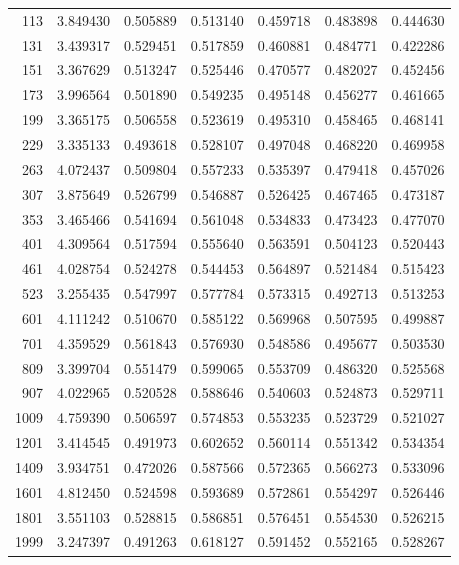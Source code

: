 \documentclass[11pt,reqno]{amsart}
\numberwithin{equation}{section}
\theoremstyle{plain}
\theoremstyle{definition}
\theoremstyle{remark}
\begin{document}
\begin{center}
\begin{longtable}{rrrrrrr}
113 & 3.849430 & 0.505889 & 0.513140 & 0.459718 & 0.483898 & 0.444630\\
131 & 3.439317 & 0.529451 & 0.517859 & 0.460881 & 0.484771 & 0.422286\\
151 & 3.367629 & 0.513247 & 0.525446 & 0.470577 & 0.482027 & 0.452456\\
173 & 3.996564 & 0.501890 & 0.549235 & 0.495148 & 0.456277 & 0.461665\\
199 & 3.365175 & 0.506558 & 0.523619 & 0.495310 & 0.458465 & 0.468141\\
229 & 3.335133 & 0.493618 & 0.528107 & 0.497048 & 0.468220 & 0.469958\\
263 & 4.072437 & 0.509804 & 0.557233 & 0.535397 & 0.479418 & 0.457026\\
307 & 3.875649 & 0.526799 & 0.546887 & 0.526425 & 0.467465 & 0.473187\\
353 & 3.465466 & 0.541694 & 0.561048 & 0.534833 & 0.473423 & 0.477070\\
401 & 4.309564 & 0.517594 & 0.555640 & 0.563591 & 0.504123 & 0.520443\\
461 & 4.028754 & 0.524278 & 0.544453 & 0.564897 & 0.521484 & 0.515423\\
523 & 3.255435 & 0.547997 & 0.577784 & 0.573315 & 0.492713 & 0.513253\\
601 & 4.111242 & 0.510670 & 0.585122 & 0.569968 & 0.507595 & 0.499887\\
701 & 4.359529 & 0.561843 & 0.576930 & 0.548586 & 0.495677 & 0.503530\\
809 & 3.399704 & 0.551479 & 0.599065 & 0.553709 & 0.486320 & 0.525568\\
907 & 4.022965 & 0.520528 & 0.588646 & 0.540603 & 0.524873 & 0.529711\\
1009 & 4.759390 & 0.506597 & 0.574853 & 0.553235 & 0.523729 & 0.521027\\
1201 & 3.414545 & 0.491973 & 0.602652 & 0.560114 & 0.551342 & 0.534354\\
1409 & 3.934751 & 0.472026 & 0.587566 & 0.572365 & 0.566273 & 0.533096\\
1601 & 4.812450 & 0.524598 & 0.593689 & 0.572861 & 0.554297 & 0.526446\\
1801 & 3.551103 & 0.528815 & 0.586851 & 0.576451 & 0.554530 & 0.526215\\
1999 & 3.247397 & 0.491263 & 0.618127 & 0.591452 & 0.552165 & 0.528267\\
\bottomrule
\end{longtable}
\end{center}
\end{document}
